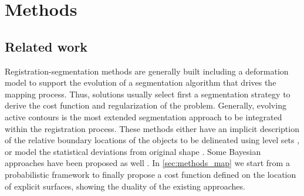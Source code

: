 %
%
%
%


\section*{Methods}
\label{sec:methods}
%
\subsection*{Related work}
\label{sec:methods_background}
Registration-segmentation methods are generally built including a deformation model to
  support the evolution of a segmentation algorithm that drives the mapping process.
Thus, solutions usually select first a segmentation strategy to derive the cost function and
  regularization of the problem.
Generally, evolving active contours is the most extended segmentation approach to be
  integrated within the registration process.
These methods either have an implicit description of the relative boundary locations of the
  objects to be delineated using level sets \citep{chen_using_2002,bresson_variational_2006,
  chan_level_2005}, or model the statistical deviations from original shape
  \citep{cremers_kernel_2006,gastaud_combining_2004}.
Some Bayesian approaches have been proposed as well \citep{wyatt_map_2003,gass_simultaneous_2014}.
In \autoref{sec:methods_map} we start from a probabilistic framework to finally propose
	a cost function defined on the location of explicit surfaces, showing the duality of the
	existing approaches.

